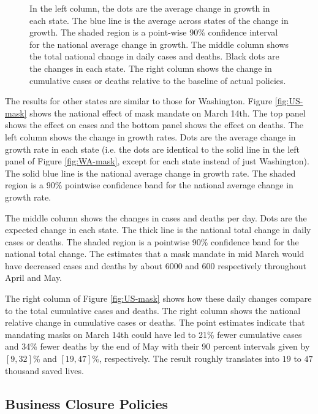 \documentclass[3p, longtitle]{elsarticle}
\theoremstyle{definition}
\begin{document}
\begin{figure}[ht]
\begin{minipage}{\linewidth}
    \begin{flushleft}
      \footnotesize In the left column, the dots are the average
      change in growth in each state. The blue line is the average
      across states of the change in growth. The shaded region is a
      point-wise 90\% confidence interval for the national average
      change in growth.  The middle column shows the total national
      change in daily cases and deaths. Black dots are the changes in each
      state.  The right column shows the change in cumulative cases or
      deaths relative to the baseline of actual policies.
    \end{flushleft}
  \end{minipage}
\end{figure}


The results for other states are similar to those for Washington.
Figure \ref{fig:US-mask} shows the national effect of mask mandate on
March 14th. The top panel shows the effect on cases and the bottom
panel shows the effect on deaths. The left column shows the change in
growth rates. Dots are the average change in growth rate in each state
(i.e. the dots are identical to the solid line in the left panel of
Figure \ref{fig:WA-mask}, except for each state instead of just
Washington). The solid blue line is the national average change in growth
rate. The shaded region is a 90\% pointwise confidence band for the
national average change in growth rate.

The middle column shows the changes in cases and deaths per day. Dots
are the expected change in each state. The thick line is the national
total change in daily cases or deaths. The shaded region is a
pointwise 90\% confidence band for the national total change. The
estimates that a mask mandate in mid March would have decreased cases
and deaths by about 6000 and 600 respectively throughout April and
May.

The right column of Figure \ref{fig:US-mask} shows how these daily
changes compare to the total cumulative cases and deaths. The right
column shows the national relative change in cumulative cases
or deaths. The point estimates indicate that mandating masks on March
14th could have led to 21\% fewer cumulative cases and 34\% fewer
deaths by the end of May with their 90 percent intervals
given by $[9,32]$\% and $[19,47]$\%, respectively.
The result roughly translates into $19$ to $47$ thousand saved lives.

\subsection{Business Closure Policies}
\end{document}
